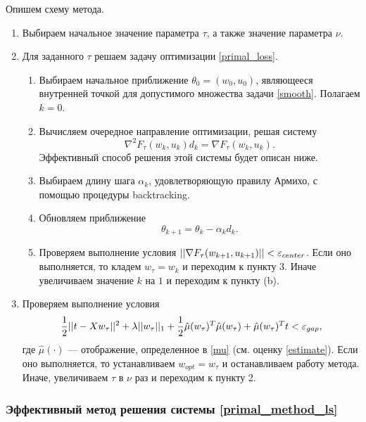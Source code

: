 \documentclass[12pt]{article}
\begin{document}
		Опишем схему метода.
		\begin{enumerate}
			\item Выбираем начальное значение параметра $\tau$, а также значение параметра $\nu$.
			
			\item Для заданного $\tau$ решаем задачу оптимизации \ref{primal_loss}. 
			\begin{enumerate}
				\item Выбираем начальное приближение $\theta_0 = (w_0, u_0) $, являющееся внутренней точкой для допустимого множества задачи \ref{smooth}. Полагаем $k = 0$.
				
				\item Вычисляем очередное направление оптимизации, решая систему
				\begin{equation}\label{primal_method_ls}
					\nabla^2 F_\tau(w_k, u_k) d_k = \nabla F_\tau(w_k, u_k).
				\end{equation}
				Эффективный способ решения этой системы будет описан ниже.
				
				\item Выбираем длину шага $\alpha_k$, удовлетворяющую правилу Армихо, с помощью процедуры backtracking.
				
				\item Обновляем приближение 
				$$\theta_{k+1} = \theta_k - \alpha_k d_k.$$
				
				\item Проверяем выполнение условия $||\nabla F_\tau(w_{k+1}, u_{k+1})|| < \varepsilon_{center}$. Если оно выполняется, то кладем $w_{\tau} = w_k$ и переходим к пункту 3. Иначе увеличиваем значение $k$ на $1$ и переходим к пункту (b).
			\end{enumerate}
			
			\item Проверяем выполнение условия 
			$$\frac 1 2 ||t - X w_\tau||^2 + \lambda ||w_\tau||_1 + \frac 1 2 \hat\mu(w_\tau)^T \hat\mu(w_\tau) + \hat\mu(w_\tau)^T t < \varepsilon_{gap}, $$
			где $\hat\mu(\cdot)$ — отображение, определенное в \ref{mu}  (см. оценку \ref{estimate}). Если оно выполняется, то устанавливаем $w_{opt} = w_\tau$ и останавливаем работу метода. Иначе, увеличиваем $\tau$ в $\nu$ раз и переходим к пункту 2.
 		\end{enumerate}
		
		\subsubsection{Эффективный метод решения системы \ref{primal_method_ls}}
			
\end{document}
